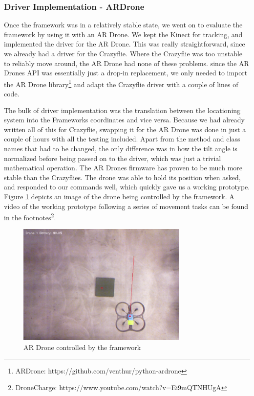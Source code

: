 \subsubsection{Driver Implementation - ARDrone}
Once the framework was in a relatively stable state, we went on to evaluate the framework by using it with an AR Drone. We kept the Kinect for tracking, and implemented the driver for the AR Drone. This was really straightforward, since we already had a driver for the Crazyflie. Where the Crazyflie was too unstable to reliably move around, the AR Drone had none of these problems. since the AR Drones API was essentially just a drop-in replacement, we only needed to import the AR Drone library\footnote{ARDrone: https://github.com/venthur/python-ardrone} and adapt the Crazyflie driver with a couple of lines of code.

The bulk of driver implementation was the translation between the locationing system into the Frameworks coordinates and vice versa. Because we had already written all of this for Crazyflie, swapping it for the AR Drone was done in just a couple of hours with all the testing included. Apart from the method and class names that had to be changed, the only difference was in how the tilt angle is normalized before being passed on to the driver, which was just a trivial mathematical operation. The AR Drones firmware has proven to be much more stable than the Crazyflies. The drone was able to hold its position when asked, and responded to our commands well, which quickly gave us a working prototype. Figure \ref{fig:ardrone} depicts an image of the drone being controlled by the framework. A video of the working prototype following a series of movement tasks can be found in the footnotes\footnote{DroneCharge: https://www.youtube.com/watch?v=Ei9mQTNHUgA}.

\begin{figure}[h]
\begin{center}
\includegraphics[height=6cm]{images/drone.png}
\caption{AR Drone controlled by the framework}
\label{fig:ardrone}
\end{center}
\end{figure}

